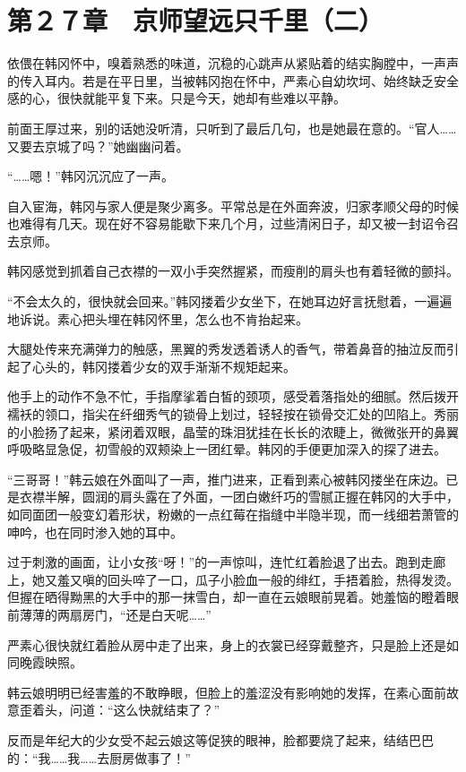 \section{第２７章　京师望远只千里（二）}

依偎在韩冈怀中，嗅着熟悉的味道，沉稳的心跳声从紧贴着的结实胸膛中，一声声的传入耳内。若是在平日里，当被韩冈抱在怀中，严素心自幼坎坷、始终缺乏安全感的心，很快就能平复下来。只是今天，她却有些难以平静。

前面王厚过来，别的话她没听清，只听到了最后几句，也是她最在意的。“官人……又要去京城了吗？”她幽幽问着。

“……嗯！”韩冈沉沉应了一声。

自入宦海，韩冈与家人便是聚少离多。平常总是在外面奔波，归家孝顺父母的时候也难得有几天。现在好不容易能歇下来几个月，过些清闲日子，却又被一封诏令召去京师。

韩冈感觉到抓着自己衣襟的一双小手突然握紧，而瘦削的肩头也有着轻微的颤抖。

“不会太久的，很快就会回来。”韩冈搂着少女坐下，在她耳边好言抚慰着，一遍遍地诉说。素心把头埋在韩冈怀里，怎么也不肯抬起来。

大腿处传来充满弹力的触感，黑翼的秀发透着诱人的香气，带着鼻音的抽泣反而引起了心头的，韩冈搂着少女的双手渐渐不规矩起来。

他手上的动作不急不忙，手指摩挲着白皙的颈项，感受着落指处的细腻。然后拨开襦袄的领口，指尖在纤细秀气的锁骨上划过，轻轻按在锁骨交汇处的凹陷上。秀丽的小脸扬了起来，紧闭着双眼，晶莹的珠泪犹挂在长长的浓睫上，微微张开的鼻翼呼吸略显急促，初雪般的双颊染上一团红晕。韩冈的手便更加深入的探了进去。

“三哥哥！”韩云娘在外面叫了一声，推门进来，正看到素心被韩冈搂坐在床边。已是衣襟半解，圆润的肩头露在了外面，一团白嫩纤巧的雪腻正握在韩冈的大手中，如同面团一般变幻着形状，粉嫩的一点红莓在指缝中半隐半现，而一线细若萧管的呻吟，也在同时渗入她的耳中。

过于刺激的画面，让小女孩“呀！”的一声惊叫，连忙红着脸退了出去。跑到走廊上，她又羞又嗔的回头啐了一口，瓜子小脸血一般的绯红，手捂着脸，热得发烫。但握在晒得黝黑的大手中的那一抹雪白，却一直在云娘眼前晃着。她羞恼的瞪着眼前薄薄的两扇房门，“还是白天呢……”

严素心很快就红着脸从房中走了出来，身上的衣裳已经穿戴整齐，只是脸上还是如同晚霞映照。

韩云娘明明已经害羞的不敢睁眼，但脸上的羞涩没有影响她的发挥，在素心面前故意歪着头，问道：“这么快就结束了？”

反而是年纪大的少女受不起云娘这等促狭的眼神，脸都要烧了起来，结结巴巴的：“我……我……去厨房做事了！”


